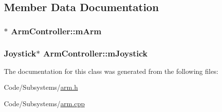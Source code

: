 \subsection{\-Member \-Data \-Documentation}
\hypertarget{class_arm_controller_ae26fda2c2b96fcd07a6227f0071f634f}{
\subsubsection[{m\-Arm}]{$\ast$ {\bf \-Arm\-Controller\-::m\-Arm}}}\label{class_arm_controller_ae26fda2c2b96fcd07a6227f0071f634f}
\hypertarget{class_arm_controller_a00ea9e1d705531f8c32bef2f92a1bd5f}{
\subsubsection[{m\-Joystick}]{\setlength{\rightskip}{0pt plus 5cm}\-Joystick$\ast$ {\bf \-Arm\-Controller\-::m\-Joystick}}}\label{class_arm_controller_a00ea9e1d705531f8c32bef2f92a1bd5f}


\-The documentation for this class was generated from the following files\-:\begin{DoxyCompactItemize}
\item 
\-Code/\-Subsystems/\hyperlink{arm_8h}{arm.\-h}\item 
\-Code/\-Subsystems/\hyperlink{arm_8cpp}{arm.\-cpp}\end{DoxyCompactItemize}
